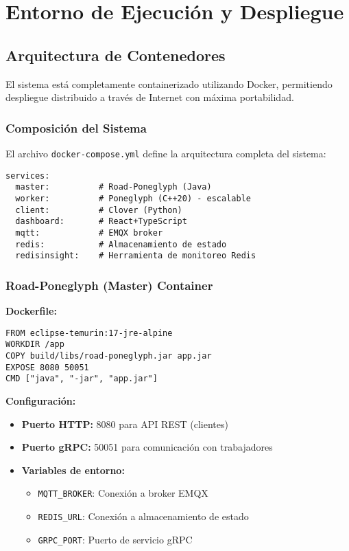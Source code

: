 \section{Entorno de Ejecución y Despliegue}

\subsection{Arquitectura de Contenedores}

El sistema está completamente containerizado utilizando Docker, permitiendo despliegue distribuido a través de Internet con máxima portabilidad.

\subsubsection{Composición del Sistema}

El archivo \texttt{docker-compose.yml} define la arquitectura completa del sistema:

\begin{verbatim}
services:
  master:          # Road-Poneglyph (Java)
  worker:          # Poneglyph (C++20) - escalable
  client:          # Clover (Python)
  dashboard:       # React+TypeScript
  mqtt:            # EMQX broker
  redis:           # Almacenamiento de estado
  redisinsight:    # Herramienta de monitoreo Redis
\end{verbatim}

\subsubsection{Road-Poneglyph (Master) Container}

\textbf{Dockerfile:}
\begin{verbatim}
FROM eclipse-temurin:17-jre-alpine
WORKDIR /app
COPY build/libs/road-poneglyph.jar app.jar
EXPOSE 8080 50051
CMD ["java", "-jar", "app.jar"]
\end{verbatim}

\textbf{Configuración:}
\begin{itemize}
    \item \textbf{Puerto HTTP:} 8080 para API REST (clientes)
    \item \textbf{Puerto gRPC:} 50051 para comunicación con trabajadores
    \item \textbf{Variables de entorno:}
    \begin{itemize}
        \item \texttt{MQTT\_BROKER}: Conexión a broker EMQX
        \item \texttt{REDIS\_URL}: Conexión a almacenamiento de estado
        \item \texttt{GRPC\_PORT}: Puerto de servicio gRPC
    \end{itemize}
\end{itemize}

